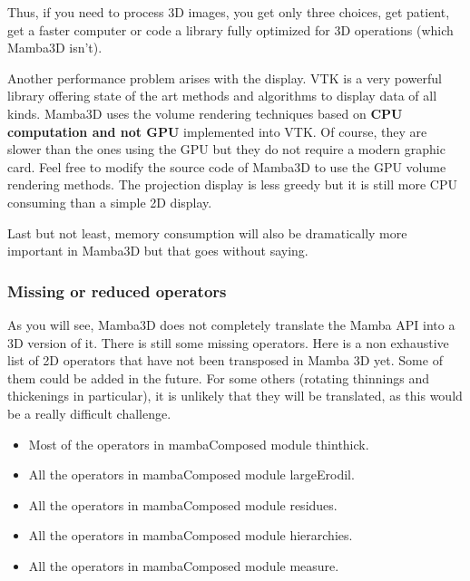 \documentclass[a4paper,10pt,oneside]{article}
\begin{document}
Thus, if you need to process 3D images, you get only three choices, get patient, 
get a faster computer or code a library fully optimized for 3D operations 
(which Mamba3D isn't).

Another performance problem arises with the display. VTK is a very powerful
library offering state of the art methods and algorithms to display 
data of all kinds. Mamba3D uses the volume rendering techniques based on 
\textbf{CPU computation and not GPU} implemented into VTK. Of course, they
are slower than the ones using the GPU but they do not require a modern
graphic card. Feel free to modify the source code of Mamba3D to use the
GPU volume rendering methods. The projection display is less greedy but it
is still more CPU consuming than a simple 2D display.


Last but not least, memory consumption will also be dramatically more important
in Mamba3D but that goes without saying.

\subsubsection{Missing or reduced operators}
\label{cha:missing3D}

As you will see, Mamba3D does not completely translate the Mamba API into
a 3D version of it. There is still some missing operators. Here is a non
exhaustive list of 2D operators that have not been transposed in Mamba 3D yet.
Some of them could be added in the future. For some others (rotating thinnings
and thickenings in particular), it is unlikely that they will be translated, as
this would be a really difficult challenge.

\begin{itemize}
\item Most of the operators in mambaComposed module thinthick.
\item All the operators in mambaComposed module largeErodil.
\item All the operators in mambaComposed module residues.
\item All the operators in mambaComposed module hierarchies.
\item All the operators in mambaComposed module measure.
\end{itemize}
\end{document}
